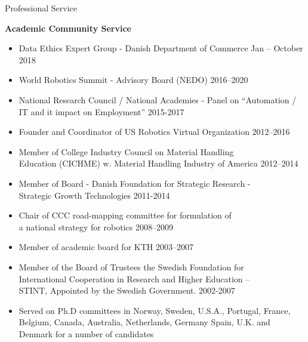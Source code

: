 \documentclass{article}
\begin{document}
\begin{cv}


\begin{cvlist}{Professional Service}%
\item {\bf Academic Community Service}
  \begin{itemize}
  \item Data Ethics Expert Group - Danish Department of Commerce \cftdotfill{\cftdotsep}
    Jan -- October 2018
  \item World Robotics Summit - Advisory Board (NEDO)
    \cftdotfill{\cftdotsep} 2016--2020
  \item National Research Council / National Academies - Panel on
    ``Automation / IT and it impact on Employment''
    \cftdotfill{\cftdotsep} 2015-2017
  \item Founder and Coordinator of US Robotics Virtual Organization
    \cftdotfill{\cftdotsep} 2012--2016
  \item Member of College Industry Council on Material Handling\\
    Education (CICHME) w. Material Handling Industry of America
    \cftdotfill{\cftdotsep} 2012--2014
  \item Member of Board - Danish Foundation for Strategic Research -\\
    Strategic Growth Technologies \cftdotfill{\cftdotsep} 2011-2014
  \item Chair of CCC road-mapping committee for formulation of \\
    a national strategy for robotics \cftdotfill{\cftdotsep}
    2008--2009
  \item Member of academic board for KTH \cftdotfill{\cftdotsep}
    2003--2007
  \item Member of the Board of Trustees the Swedish Foundation for\\
    International Cooperation in Research and Higher Education --\\
    STINT, Appointed by the Swedish Government.
    \cftdotfill{\cftdotsep} 2002-2007
  \item Served on Ph.D committees in Norway, Sweden, U.S.A., Portugal,
    France, Belgium, Canada, Australia, Netherlands, Germany Spain,
    U.K. and Denmark for a number of candidates
  \end{itemize}


\end{cvlist}
\end{cv}
\end{document}
